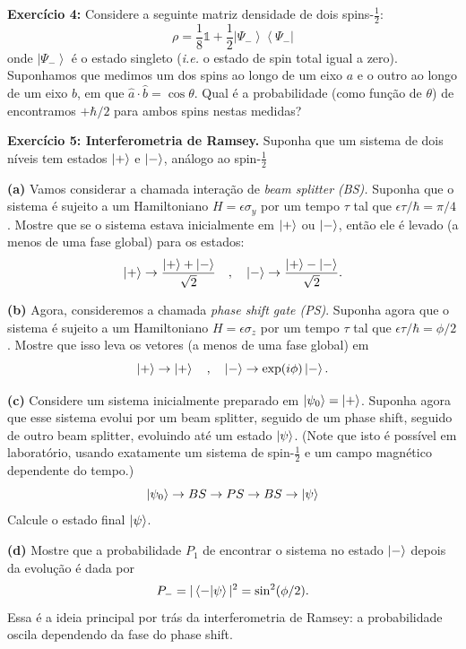 \documentclass[12pt]{article}
\begin{document}
\vspace*{1em}

\textbf{Exercício 4:} Considere a seguinte matriz densidade de dois spins-$\frac{1}{2}$:
\[
\rho=\frac{1}{8} \mathbb{1}+\frac{1}{2}\left|\Psi_{-}\right\rangle\left\langle\Psi_{-}\right|
\]
onde \(\left|\Psi_{-}\right\rangle\) é o estado singleto (\textit{i.e.} o estado de spin total igual a zero). Suponhamos que
medimos um dos spins ao longo de um eixo \(a\) e o outro ao longo de um eixo \(b\), em que
\(\hat{a} \cdot \hat{b}=\cos \theta\). Qual é a probabilidade (como função de \(\theta\)) de encontramos \(+\hbar / 2\) para ambos
spins nestas medidas?

\textbf{Exercício 5: Interferometria de Ramsey.} Suponha que um sistema de dois níveis tem estados $\ket{+}$ e $\ket{-}$, análogo ao spin-$\frac{1}{2}$

\textbf{(a)} Vamos considerar a chamada interação de \textit{beam splitter (BS).} Suponha que o sistema é sujeito a um Hamiltoniano $H = \epsilon \sigma_y$ por um tempo $\tau$ tal que $\epsilon \tau /\hbar = \pi/4$.
Mostre que se o sistema estava inicialmente em $\ket{+}$ ou $\ket{-}$, então ele é levado (a menos de uma fase global) para os estados:
\[
\ket{+} \to \frac{\ket{+} + \ket{-}}{\sqrt{2}}
\quad,\quad
\ket{-} \to \frac{\ket{+} - \ket{-}}{\sqrt{2}}.
\]

\textbf{(b)} Agora, consideremos a chamada \textit{phase shift gate (PS)}. Suponha agora que o sistema é sujeito a um Hamiltoniano $H = \epsilon \sigma_z$ por um tempo $\tau$ tal que $\epsilon \tau /\hbar = \phi/2$. Mostre que isso leva os vetores (a menos de uma fase global) em
\[
\ket{+} \to \ket{+}\quad,\quad\ket{-} \to \exp(i\phi)\ket{-}.
\]

\textbf{(c)} Considere um sistema inicialmente preparado em $\ket{\psi_0} = \ket{+}$. Suponha agora que esse sistema evolui por um beam splitter, seguido de um phase shift, seguido de outro beam splitter, evoluindo até um estado $\ket{\psi}$. (Note que isto é possível em laboratório, usando exatamente um sistema de spin-$\frac{1}{2}$ e um campo magnético dependente do tempo.)
\[
\ket{\psi_0} \to BS \to PS \to BS \to \ket{\psi}
\]
Calcule o estado final $\ket{\psi}$. 

\textbf{(d)} Mostre que a probabilidade $P_1$ de encontrar o sistema no estado $\ket{-}$ depois da evolução é dada por
\[
P_- = |\bra{-}\ket{\psi}|^2 = \sin^2(\phi/2).
\]
Essa é a ideia principal por trás da interferometria de Ramsey: a probabilidade oscila
dependendo da fase do phase shift.
\end{document}
